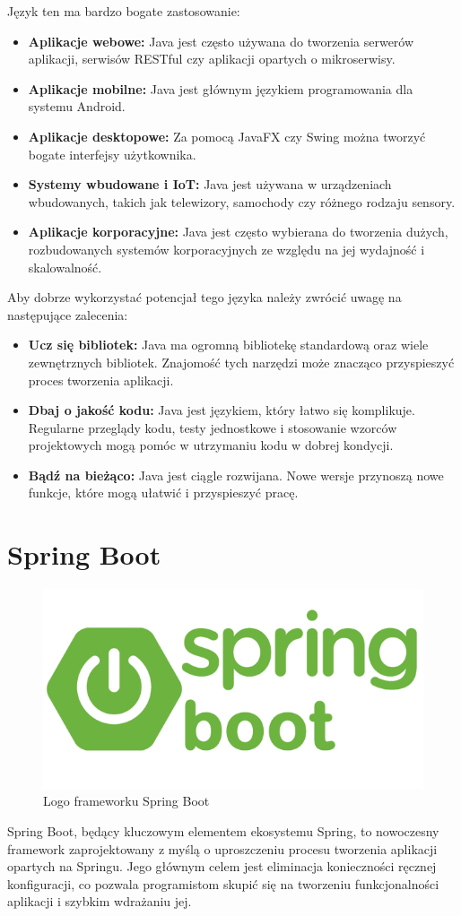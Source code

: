 Język ten ma bardzo bogate zastosowanie:
\begin{itemize}
\item \textbf{Aplikacje webowe:} Java jest często używana do tworzenia serwerów aplikacji, serwisów RESTful czy aplikacji opartych o mikroserwisy.
\item \textbf{Aplikacje mobilne:} Java jest głównym językiem programowania dla systemu Android.
\item \textbf{Aplikacje desktopowe:} Za pomocą JavaFX czy Swing można tworzyć bogate interfejsy użytkownika.
\item \textbf{Systemy wbudowane i IoT:} Java jest używana w urządzeniach wbudowanych, takich jak telewizory, samochody czy różnego rodzaju sensory.
\item \textbf{Aplikacje korporacyjne:} Java jest często wybierana do tworzenia dużych, rozbudowanych systemów korporacyjnych ze względu na jej wydajność i skalowalność.
\end{itemize}

Aby dobrze wykorzystać potencjał tego języka należy zwrócić uwagę na następujące zalecenia:
\begin{itemize}
\item \textbf{Ucz się bibliotek:} Java ma ogromną bibliotekę standardową oraz wiele zewnętrznych bibliotek. Znajomość tych narzędzi może znacząco przyspieszyć proces tworzenia aplikacji.
\item \textbf{Dbaj o jakość kodu:} Java jest językiem, który łatwo się komplikuje. Regularne przeglądy kodu, testy jednostkowe i stosowanie wzorców projektowych mogą pomóc w utrzymaniu kodu w dobrej kondycji.
\item \textbf{Bądź na bieżąco:} Java jest ciągle rozwijana. Nowe wersje przynoszą nowe funkcje, które mogą ułatwić i przyspieszyć pracę.
\end{itemize}

\section{Spring Boot}
\begin{figure}[h]
    \centering
    \includegraphics[width=0.6\linewidth]{./img/springboot.png}
    \caption{Logo frameworku Spring Boot}
    \label{fig:Springboot}
\end{figure}
Spring Boot, będący kluczowym elementem ekosystemu Spring, to nowoczesny framework zaprojektowany z myślą o uproszczeniu procesu tworzenia aplikacji opartych na Springu. Jego głównym celem jest eliminacja konieczności ręcznej konfiguracji, co pozwala programistom skupić się na tworzeniu funkcjonalności aplikacji i szybkim wdrażaniu jej.

